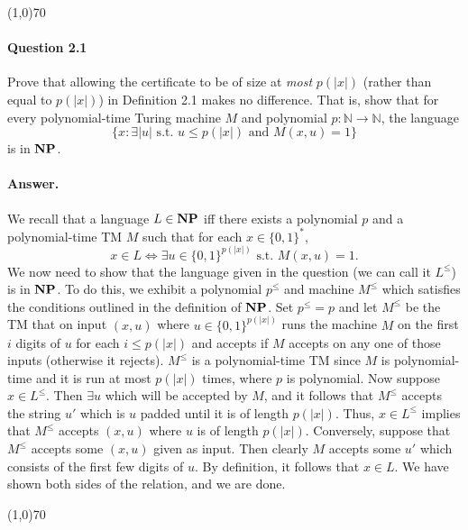 \begin{center}
	\line(1,0){70}
\end{center}

\paragraph{Question 2.1} Prove that allowing the certificate to be of size at \textit{most} $p(|x|)$ (rather than equal to $p(|x|)$) in Definition 2.1 makes no difference. That is, show that for every polynomial-time Turing machine $M$ and polynomial $p:\mathbb{N}\rightarrow\mathbb{N}$, the language
\begin{equation*}
	\{x:\exists |u| \text{ s.t. } u\leq p(|x|)\text{ and } M(x,u)=1\}
\end{equation*}
is in $\mathbf{NP}$.

\paragraph{Answer.} We recall that a language $L\in\mathbf{NP}$ iff there exists a polynomial $p$ and a polynomial-time TM $M$ such that for each $x\in\{0,1\}^{*}$,
\begin{equation*}
	x\in L\Leftrightarrow \exists u\in\{0,1\}^{p(|x|)}\text{ s.t. } M(x, u)=1.
\end{equation*}
We now need to show that the language given in the question (we can call it $L^{\leq}$) is in $\mathbf{NP}$. To do this, we exhibit a polynomial $p^{\leq}$ and machine $M^{\leq}$ which satisfies the conditions outlined in the definition of $\mathbf{NP}$. Set $p^{\leq}=p$ and let $M^{\leq}$ be the TM that on input $(x, u)$ where $u\in\{0,1\}^{p(|x|)}$ runs the machine $M$ on the first $i$ digits of $u$ for each $i\leq p(|x|)$ and accepts if $M$ accepts on any one of those inputs (otherwise it rejects). $M^{\leq}$ is a polynomial-time TM since $M$ is polynomial-time and it is run at most $p(|x|)$ times, where $p$ is polynomial. Now suppose $x\in L^{\leq}$. Then $\exists u$ which will be accepted by $M$, and it follows that $M^{\leq}$ accepts the string $u'$ which is $u$ padded until it is of length $p(|x|)$. Thus, $x\in L^{\leq}$ implies that $M^{\leq}$ accepts $(x,u)$ where $u$ is of length $p(|x|)$. Conversely, suppose that $M^{\leq}$ accepts some $(x, u)$ given as input. Then clearly $M$ accepts some $u'$ which consists of the first few digits of $u$. By definition, it follows that $x\in L$. We have shown both sides of the relation, and we are done.

\begin{center}
	\line(1,0){70}
\end{center}


